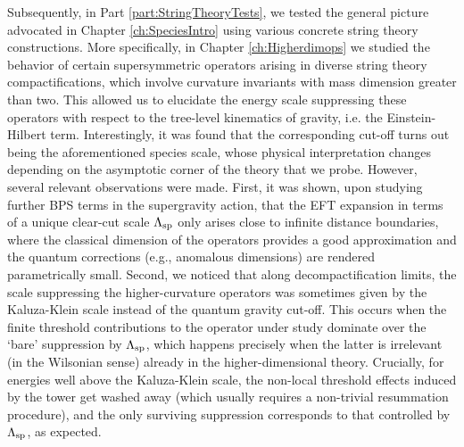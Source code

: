 Subsequently, in Part \ref{part:StringTheoryTests}, we tested the general picture advocated in Chapter \ref{ch:SpeciesIntro} using various concrete string theory constructions. More specifically, in Chapter \ref{ch:Higherdimops} we studied the behavior of certain supersymmetric operators arising in diverse string theory compactifications, which involve curvature invariants with mass dimension greater than two. This allowed us to elucidate the energy scale suppressing these operators with respect to the tree-level kinematics of gravity, i.e. the Einstein-Hilbert term. Interestingly, it was found that the corresponding cut-off turns out being the aforementioned species scale, whose physical interpretation changes depending on the asymptotic corner of the theory that we probe. However, several relevant observations were made. First, it was shown, upon studying further BPS terms in the supergravity action, that the EFT expansion in terms of a unique clear-cut scale $\Lambda_{\text{sp}}$ only arises close to infinite distance boundaries, where the classical dimension of the operators provides a good approximation and the quantum corrections (e.g., anomalous dimensions) are rendered parametrically small. Second, we noticed that along decompactification limits, the scale suppressing the higher-curvature operators was sometimes given by the Kaluza-Klein scale instead of the quantum gravity cut-off. This occurs when the finite threshold contributions to the operator under study dominate over the ‘bare’ suppression by $\Lambda_{\text{sp}}$, which happens precisely when the latter is irrelevant (in the Wilsonian sense) already in the higher-dimensional theory. Crucially, for energies well above the Kaluza-Klein scale, the non-local threshold effects induced by the tower get washed away (which usually requires a non-trivial resummation procedure), and the only surviving suppression corresponds to that controlled by $\Lambda_{\text{sp}}$, as expected.

